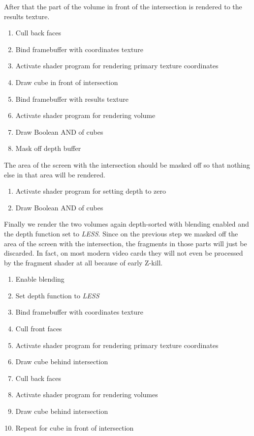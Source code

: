 \documentclass{article}
\begin{document}
After that the part of the volume in front of the intersection is rendered to
the results texture.

\begin{enumerate}
  \item Cull back faces
  \item Bind framebuffer with coordinates texture
  \item Activate shader program for rendering primary texture coordinates
  \item Draw cube in front of intersection
  \item Bind framebuffer with results texture
  \item Activate shader program for rendering volume
  \item Draw Boolean AND of cubes
  \item Mask off depth buffer
\end{enumerate}

The area of the screen with the intersection should be masked off so that
nothing else in that area will be rendered.

\begin{enumerate}
  \item Activate shader program for setting depth to zero
  \item Draw Boolean AND of cubes
\end{enumerate}

Finally we render the two volumes again depth-sorted with blending enabled and
the depth function set to \emph{LESS}.  Since on the previous step we masked off
the area of the screen with the intersection, the fragments in those parts will
just be discarded.  In fact, on most modern video cards they will not even be
processed by the fragment shader at all because of early Z-kill.

\begin{enumerate}
  \item Enable blending
  \item Set depth function to \emph{LESS}
  \item Bind framebuffer with coordinates texture
  \item Cull front faces
  \item Activate shader program for rendering primary texture coordinates
  \item Draw cube behind intersection
  \item Cull back faces
  \item Activate shader program for rendering volumes
  \item Draw cube behind intersection
  \item Repeat for cube in front of intersection
\end{enumerate}
\end{document}
